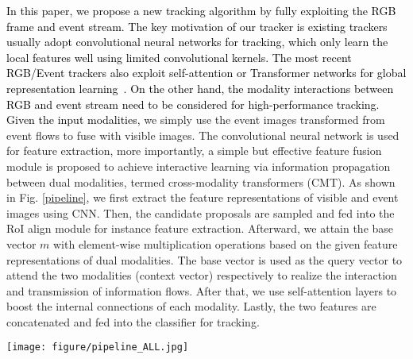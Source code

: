 \documentclass[journal]{IEEEtran}
\begin{document}
\textcolor{black}{
In this paper, we propose a new tracking algorithm by fully exploiting the RGB frame and event stream. The key motivation of our tracker is existing trackers usually adopt convolutional neural networks for tracking, which only learn the local features well using limited convolutional kernels. The most recent RGB/Event trackers also exploit self-attention or Transformer networks for global representation learning~\cite{zhang2022STNet, chen2021TransT}. On the other hand, the modality interactions between RGB and event stream need to be considered for high-performance tracking. Given the input modalities, 
}
we simply use the event images transformed from event flows to fuse with visible images. The convolutional neural network is used for feature extraction, more importantly, a simple but effective feature fusion module is proposed to achieve interactive learning via information propagation between dual modalities, termed cross-modality transformers (CMT). As shown in Fig. \ref{pipeline}, we first extract the feature representations of visible and event images using CNN. Then, the candidate proposals are sampled and fed into the RoI align module for instance feature extraction. Afterward, we attain the base vector $m$ with element-wise multiplication operations based on the given feature representations of dual modalities. The base vector is used as the query vector to attend the two modalities (context vector) respectively to realize the interaction and transmission of information flows. After that, we use self-attention layers to boost the internal connections of each modality. Lastly, the two features are concatenated and fed into the classifier for tracking. 





\begin{figure*}
\center
\texttt{[image: figure/pipeline\_ALL.jpg]}
\caption{ 
\textcolor{black}{An overview of our proposed tracking framework via collaboration of visible frame and event streams. The RT-MDNet tracker is adopted as an example to demonstrate our tracking procedure. Given the RGB and Event frames, we first extract the positive and negative training samples from the first frame to learn a classifier. Three convolutional layers are used to extract the deep feature maps. Then, the RoI Align operator is adopted to extract the instance-level features given the extracted proposals for both modalities. The RGB and Event features are first connected using the dot product to get the base vector, then, the cross-attention is conducted for each modality to enhance the message passing. Self-attention is proposed to learn the global features that are complementary to local CNN features. Finally, we feed the feature vectors into fully connected layers for proposal classification. The best-scored proposal is selected as the tracking result of the current step and similar procedures are repeated until the end of the testing video.} }     
\label{pipeline}
\end{figure*} 	
\end{document}
